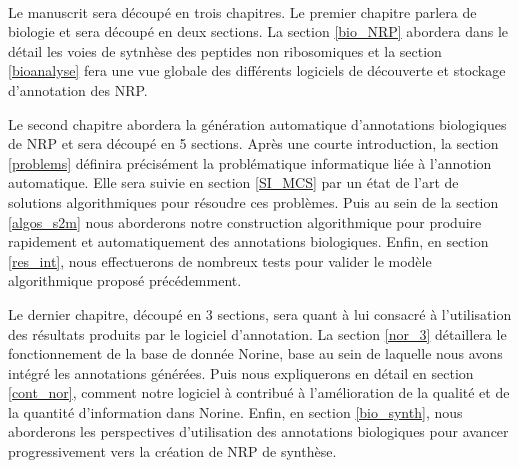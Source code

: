 ~~

Le manuscrit sera découpé en trois chapitres.
Le premier chapitre parlera de biologie et sera découpé en deux sections.
La section \ref{bio_NRP} abordera dans le détail les voies de sytnhèse des peptides non ribosomiques et la section \ref{bioanalyse} fera une vue globale des différents logiciels de découverte et stockage d'annotation des NRP.

Le second chapitre abordera la génération automatique d'annotations biologiques de NRP et sera découpé en 5 sections.
Après une courte introduction, la section \ref{problems} définira précisément la problématique informatique liée à l'annotion automatique.
Elle sera suivie en section \ref{SI_MCS} par un état de l'art de solutions algorithmiques pour résoudre ces problèmes.
Puis au sein de la section \ref{algos_s2m} nous aborderons notre construction algorithmique pour produire rapidement et automatiquement des annotations biologiques.
Enfin, en section \ref{res_int}, nous effectuerons de nombreux tests pour valider le modèle algorithmique proposé précédemment.

Le dernier chapitre, découpé en 3 sections, sera quant à lui consacré à l'utilisation des résultats produits par le logiciel d'annotation.
La section \ref{nor_3} détaillera le fonctionnement de la base de donnée Norine, base au sein de laquelle nous avons intégré les annotations générées.
Puis nous expliquerons en détail en section \ref{cont_nor}, comment notre logiciel à contribué à l'amélioration de la qualité et de la quantité d'information dans Norine.
Enfin, en section \ref{bio_synth}, nous aborderons les perspectives d'utilisation des annotations biologiques pour avancer progressivement vers la création de NRP de synthèse.